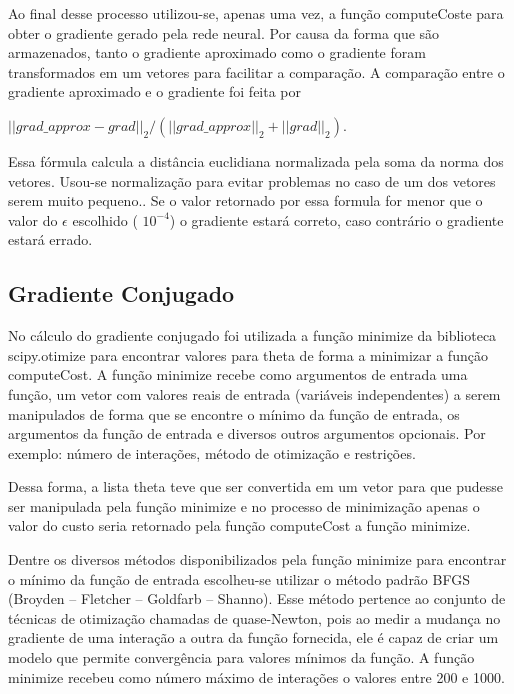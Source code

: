 \documentclass[12pt]{article}
\begin{document}
Ao final desse processo utilizou-se, apenas uma vez, a função computeCoste para obter o gradiente gerado pela rede neural.  Por causa da forma que são armazenados, tanto o gradiente aproximado como o gradiente foram transformados em um vetores para facilitar a comparação. A comparação entre o gradiente aproximado e o gradiente foi feita por 

\begin{center}
$||grad\_approx - grad||_{2}/(||grad\_approx||_{2} + ||grad||_{2})$.
\end{center}

Essa fórmula calcula a distância euclidiana normalizada pela soma da norma dos vetores. Usou-se normalização para evitar problemas no caso de um dos vetores serem muito pequeno.. Se o valor retornado por essa formula for menor que o valor do $\epsilon$ escolhido ( $10^{-4}$) o gradiente estará correto, caso contrário o gradiente estará errado.


\subsection{Gradiente Conjugado}

No cálculo do gradiente conjugado foi utilizada a função minimize da biblioteca scipy.otimize para encontrar valores para theta de forma a minimizar a função computeCost. A função minimize recebe como argumentos de entrada uma função, um vetor com valores reais de entrada (variáveis independentes) a serem manipulados de forma que se encontre o mínimo da função de entrada, os argumentos da função de entrada e diversos outros argumentos opcionais. Por exemplo: número de interações, método de otimização e restrições. 

Dessa forma, a lista theta teve que ser convertida em um vetor para que pudesse ser manipulada pela função minimize e no processo de minimização apenas o valor do custo seria retornado pela função computeCost a função minimize.

Dentre os diversos métodos disponibilizados pela função minimize para encontrar o mínimo da função de entrada escolheu-se utilizar o método padrão BFGS (Broyden – Fletcher – Goldfarb – Shanno). Esse método pertence ao conjunto de técnicas de otimização chamadas de quase-Newton, pois ao medir a mudança no gradiente de uma interação a outra da função fornecida, ele é capaz de criar um modelo que permite convergência para valores mínimos da função. A função minimize recebeu como número máximo de interações o valores entre 200 e 1000. 
\end{document}
